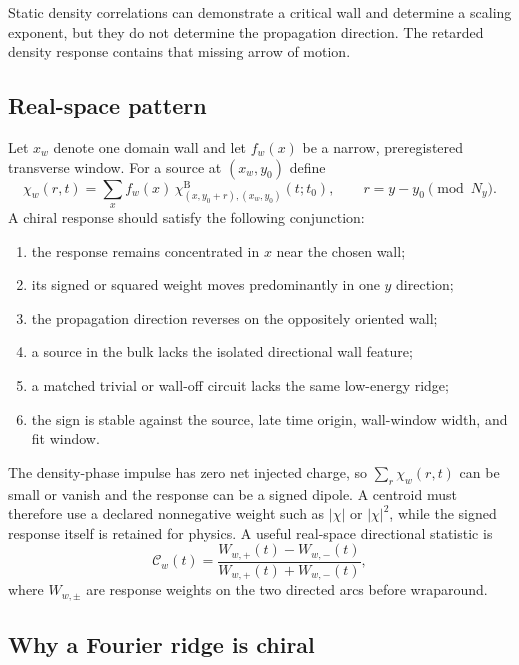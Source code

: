 \documentclass[aps,prb,onecolumn,nofootinbib,superscriptaddress]{revtex4-2}
\newcommand{\Born}{\mathrm{B}}
\begin{document}
Static density correlations can demonstrate a critical wall and determine a
scaling exponent, but they do not determine the propagation direction.  The
retarded density response contains that missing arrow of motion.

\subsection{Real-space pattern}

Let $x_w$ denote one domain wall and let $f_w(x)$ be a narrow, preregistered
transverse window.  For a source at $(x_w,y_0)$ define
\begin{equation}
  \chi_w(r,t)
  =\sum_x f_w(x)\,
  \chi^{\Born}_{(x,y_0+r),(x_w,y_0)}(t;t_0),
  \qquad r=y-y_0\pmod{N_y}.
  \label{eq:wall-window-response}
\end{equation}
A chiral response should satisfy the following conjunction:
\begin{enumerate}
  \item the response remains concentrated in $x$ near the chosen wall;
  \item its signed or squared weight moves predominantly in one $y$ direction;
  \item the propagation direction reverses on the oppositely oriented wall;
  \item a source in the bulk lacks the isolated directional wall feature;
  \item a matched trivial or wall-off circuit lacks the same low-energy ridge;
  \item the sign is stable against the source, late time origin, wall-window
  width, and fit window.
\end{enumerate}
The density-phase impulse has zero net injected charge, so $\sum_r\chi_w(r,t)$
can be small or vanish and the response can be a signed dipole.  A centroid
must therefore use a declared nonnegative weight such as $|\chi|$ or
$|\chi|^2$, while the signed response itself is retained for physics.  A useful
real-space directional statistic is
\begin{equation}
  \mathcal C_w(t)=
  \frac{W_{w,+}(t)-W_{w,-}(t)}{W_{w,+}(t)+W_{w,-}(t)},
  \label{eq:real-space-chirality}
\end{equation}
where $W_{w,\pm}$ are response weights on the two directed arcs before
wraparound.

\subsection{Why a Fourier ridge is chiral}
\end{document}
